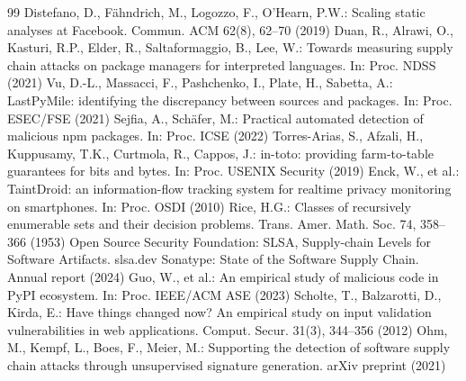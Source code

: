 \documentclass[runningheads]{llncs}
\begin{document}
\begin{thebibliography}{99}
 Distefano, D., F\"ahndrich, M., Logozzo, F., O'Hearn, P.W.: Scaling static analyses at Facebook. Commun. ACM 62(8), 62--70 (2019)
 Duan, R., Alrawi, O., Kasturi, R.P., Elder, R., Saltaformaggio, B., Lee, W.: Towards measuring supply chain attacks on package managers for interpreted languages. In: Proc. NDSS (2021)
 Vu, D.-L., Massacci, F., Pashchenko, I., Plate, H., Sabetta, A.: LastPyMile: identifying the discrepancy between sources and packages. In: Proc. ESEC/FSE (2021)
 Sejfia, A., Sch\"afer, M.: Practical automated detection of malicious npm packages. In: Proc. ICSE (2022)
 Torres-Arias, S., Afzali, H., Kuppusamy, T.K., Curtmola, R., Cappos, J.: in-toto: providing farm-to-table guarantees for bits and bytes. In: Proc. USENIX Security (2019)
 Enck, W., et al.: TaintDroid: an information-flow tracking system for realtime privacy monitoring on smartphones. In: Proc. OSDI (2010)
 Rice, H.G.: Classes of recursively enumerable sets and their decision problems. Trans. Amer. Math. Soc. 74, 358--366 (1953)
 Open Source Security Foundation: SLSA, Supply-chain Levels for Software Artifacts. slsa.dev
 Sonatype: State of the Software Supply Chain. Annual report (2024)
 Guo, W., et al.: An empirical study of malicious code in PyPI ecosystem. In: Proc. IEEE/ACM ASE (2023)
 Scholte, T., Balzarotti, D., Kirda, E.: Have things changed now? An empirical study on input validation vulnerabilities in web applications. Comput. Secur. 31(3), 344--356 (2012)
 Ohm, M., Kempf, L., Boes, F., Meier, M.: Supporting the detection of software supply chain attacks through unsupervised signature generation. arXiv preprint (2021)
\end{thebibliography}
\end{document}
